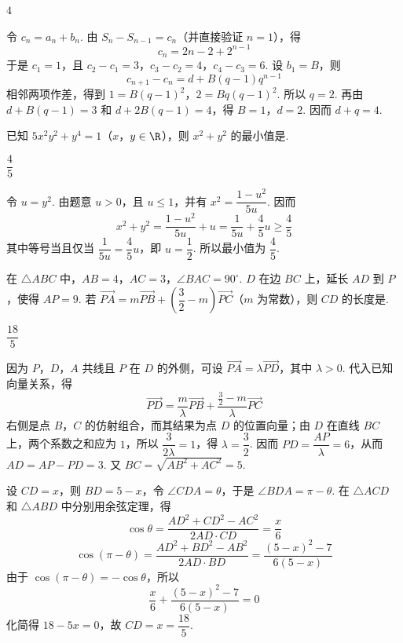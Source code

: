 \begin{answer}
\(4\)
\end{answer}

\begin{solution}
令 \(c_n=a_n+b_n\). 由 \(S_n-S_{n-1}=c_n\)（并直接验证 \(n=1\)），得
\[
c_n=2n-2+2^{n-1}
\]
于是 \(c_1=1\)，且 \(c_2-c_1=3\)，\(c_3-c_2=4\)，\(c_4-c_3=6\). 设 \(b_1=B\)，则
\[
c_{n+1}-c_n=d+B(q-1)q^{n-1}
\]
相邻两项作差，得到
\(1=B(q-1)^2\)，\(2=Bq(q-1)^2\).
所以 \(q=2\). 再由 \(d+B(q-1)=3\) 和 \(d+2B(q-1)=4\)，得 \(B=1\)，\(d=2\). 因而 \(d+q=4\).
\end{solution}

\begin{problem}
已知 \(5x^2y^2+y^4=1\)（\(x\)，\(y\in\R\)），则 \(x^2+y^2\) 的最小值是\fillinblank{}.
\end{problem}

\begin{answer}
\(\dfrac45\)
\end{answer}

\begin{solution}
令 \(u=y^2\). 由题意 \(u>0\)，且 \(u\leq1\)，并有 \(x^2=\dfrac{1-u^2}{5u}\). 因而
\[
x^2+y^2=\dfrac{1-u^2}{5u}+u=\dfrac1{5u}+\dfrac45u\geq\dfrac45
\]
其中等号当且仅当 \(\dfrac1{5u}=\dfrac45u\)，即 \(u=\dfrac12\). 所以最小值为 \(\dfrac45\).
\end{solution}

\begin{problem}
在 \(\triangle ABC\) 中，\(AB=4\)，\(AC=3\)，\(\angle BAC=90^\circ\). \(D\) 在边 \(BC\) 上，延长 \(AD\) 到 \(P\)，使得 \(AP=9\). 若 \(\overrightarrow{PA}=m\overrightarrow{PB}+\left(\dfrac32-m\right)\overrightarrow{PC}\)（\(m\) 为常数），则 \(CD\) 的长度是\fillinblank{}.

\end{problem}

\begin{answer}
\(\dfrac{18}{5}\)
\end{answer}

\begin{solution}
因为 \(P\)，\(D\)，\(A\) 共线且 \(P\) 在 \(D\) 的外侧，可设 \(\overrightarrow{PA}=\lambda\overrightarrow{PD}\)，其中 \(\lambda>0\). 代入已知向量关系，得
\[
\overrightarrow{PD}=\dfrac{m}{\lambda}\overrightarrow{PB}+\dfrac{\frac32-m}{\lambda}\overrightarrow{PC}
\]
右侧是点 \(B\)，\(C\) 的仿射组合，而其结果为点 \(D\) 的位置向量；由 \(D\) 在直线 \(BC\) 上，两个系数之和应为 \(1\)，所以 \(\dfrac{3}{2\lambda}=1\)，得 \(\lambda=\dfrac32\). 因而 \(PD=\dfrac{AP}{\lambda}=6\)，从而 \(AD=AP-PD=3\). 又 \(BC=\sqrt{AB^2+AC^2}=5\).

设 \(CD=x\)，则 \(BD=5-x\)，令 \(\angle CDA=\theta\)，于是 \(\angle BDA=\pi-\theta\). 在 \(\triangle ACD\) 和 \(\triangle ABD\) 中分别用余弦定理，得
\[
\cos\theta=\dfrac{AD^2+CD^2-AC^2}{2AD\cdot CD}=\dfrac{x}{6}
\]
\[
\cos(\pi-\theta)=\dfrac{AD^2+BD^2-AB^2}{2AD\cdot BD}=\dfrac{(5-x)^2-7}{6(5-x)}
\]
由于 \(\cos(\pi-\theta)=-\cos\theta\)，所以
\[
\dfrac{x}{6}+\dfrac{(5-x)^2-7}{6(5-x)}=0
\]
化简得 \(18-5x=0\)，故 \(CD=x=\dfrac{18}{5}\).
\end{solution}

